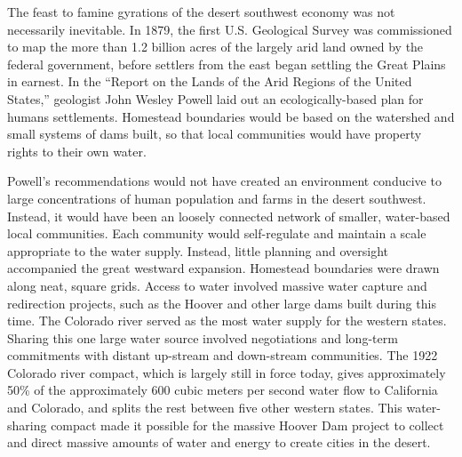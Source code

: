 \documentclass{article}
\begin{document}
The feast to famine gyrations of the desert southwest economy 
was not necessarily inevitable. In 1879, the first U.S. Geological Survey
was commissioned to map the more than 1.2 billion acres of 
the largely arid land owned by
the federal government, before settlers from the east 
began settling the Great Plains in earnest. 
In the ``Report on the Lands
of the Arid Regions of the United States,'' geologist
John Wesley Powell laid out an
ecologically-based plan for humans settlements.
Homestead boundaries would be based on 
the watershed and small systems of dams built, so that 
local communities would have property rights to their own water.

Powell's recommendations would not have created 
an environment conducive to large concentrations
of human population and farms in the desert southwest.
Instead, it would have been an loosely connected
network of smaller, water-based local communities.
Each community would self-regulate and maintain 
a scale appropriate to the water supply.
Instead, little planning and oversight accompanied
the great westward expansion. Homestead boundaries were 
drawn along neat, square grids. Access to water
involved massive water capture and redirection
projects, such as the Hoover and other large
dams built during this time. 
The Colorado river served as the most water
supply for the western states. Sharing this
one large water source involved negotiations and 
long-term commitments with distant
up-stream and down-stream communities.  
The 1922 Colorado river compact, which is
largely still in force today,
gives approximately 50\% of the approximately 600 cubic
meters per second water flow to California and
Colorado, and splits the rest between five other western states.
This water-sharing compact made it possible
for the massive Hoover Dam project
to collect and direct massive
amounts of water and energy 
to create cities in the desert.
\end{document}
